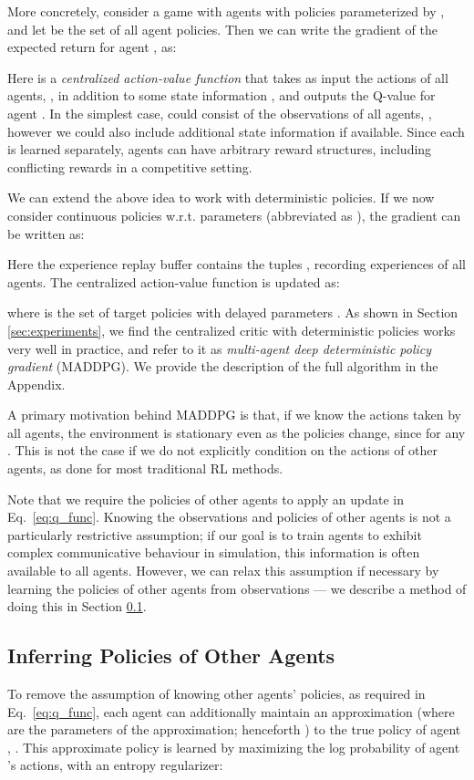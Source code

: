 \documentclass{article}
\begin{document}
More concretely, consider a game with  agents with policies parameterized by , and let  be the set of all agent policies. Then we can write the gradient of the expected return for agent ,  as:


Here  is a \textit{centralized action-value function} that takes as input the actions of all agents, , in addition to some state information , and outputs the Q-value for agent . In the simplest case,  could consist of the observations of all agents, , however we could also include additional state information if available. Since each  is learned separately, agents can have arbitrary reward structures, including conflicting rewards in a competitive setting.

We can extend the above idea to work with deterministic policies. If we now consider  continuous policies  w.r.t. parameters  (abbreviated as ), the gradient can be written as:

Here the experience replay buffer  contains the tuples , recording experiences of all agents. 
The centralized action-value function  is updated as:

where  is the set of target policies with delayed parameters . As shown in Section \ref{sec:experiments}, we find the centralized critic with deterministic policies works very well in practice, and refer to it as \textit{multi-agent deep deterministic policy gradient} (MADDPG). 
We provide the description of the full algorithm in the Appendix. 

A primary motivation behind MADDPG is that, if we know the actions taken by all agents, the environment is stationary even as the policies change, since  for any . This is not the case if we do not explicitly condition on the actions of other agents, as done for most traditional RL methods. 

Note that we require the policies of other agents to apply an update in Eq.~\ref{eq:q_func}. Knowing the observations and policies of other agents is not a particularly restrictive assumption; if our goal is to train agents to exhibit complex communicative behaviour in simulation, this information is often available to all agents.
However, we can relax this assumption if necessary by learning the policies of other agents from observations --- we describe a method of doing this in Section \ref{sec:modellearning}.


\subsection{Inferring Policies of Other Agents}
\label{sec:modellearning}
To remove the assumption of knowing other agents' policies, as required in Eq.~\ref{eq:q_func}, each agent  can additionally maintain an approximation  (where  are the parameters of the approximation; henceforth ) to the true policy of agent , . This approximate policy is learned by maximizing the log probability of agent 's actions, with an entropy regularizer:
\end{document}
